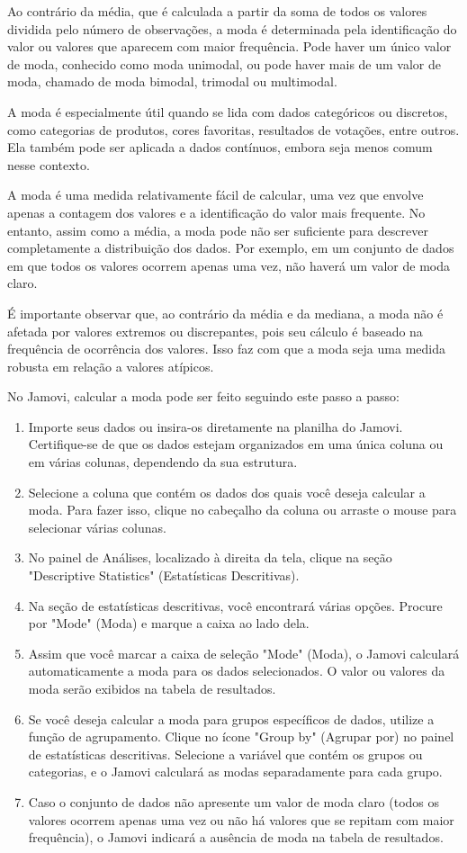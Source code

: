 Ao contrário da média, que é calculada a partir da soma de todos os valores dividida pelo número de observações, a moda é determinada pela identificação do valor ou valores que aparecem com maior frequência. Pode haver um único valor de moda, conhecido como moda unimodal, ou pode haver mais de um valor de moda, chamado de moda bimodal, trimodal ou multimodal.

A moda é especialmente útil quando se lida com dados categóricos ou discretos, como categorias de produtos, cores favoritas, resultados de votações, entre outros. Ela também pode ser aplicada a dados contínuos, embora seja menos comum nesse contexto.

A moda é uma medida relativamente fácil de calcular, uma vez que envolve apenas a contagem dos valores e a identificação do valor mais frequente. No entanto, assim como a média, a moda pode não ser suficiente para descrever completamente a distribuição dos dados. Por exemplo, em um conjunto de dados em que todos os valores ocorrem apenas uma vez, não haverá um valor de moda claro.

É importante observar que, ao contrário da média e da mediana, a moda não é afetada por valores extremos ou discrepantes, pois seu cálculo é baseado na frequência de ocorrência dos valores. Isso faz com que a moda seja uma medida robusta em relação a valores atípicos.

No Jamovi, calcular a moda pode ser feito seguindo este passo a passo:

\begin{enumerate}
    \item Importe seus dados ou insira-os diretamente na planilha do Jamovi. Certifique-se de que os dados estejam organizados em uma única coluna ou em várias colunas, dependendo da sua estrutura.
    \item Selecione a coluna que contém os dados dos quais você deseja calcular a moda. Para fazer isso, clique no cabeçalho da coluna ou arraste o mouse para selecionar várias colunas.
    \item No painel de Análises, localizado à direita da tela, clique na seção "Descriptive Statistics" (Estatísticas Descritivas).
    \item Na seção de estatísticas descritivas, você encontrará várias opções. Procure por "Mode" (Moda) e marque a caixa ao lado dela.
    \item Assim que você marcar a caixa de seleção "Mode" (Moda), o Jamovi calculará automaticamente a moda para os dados selecionados. O valor ou valores da moda serão exibidos na tabela de resultados.
    \item Se você deseja calcular a moda para grupos específicos de dados, utilize a função de agrupamento. Clique no ícone "Group by" (Agrupar por) no painel de estatísticas descritivas. Selecione a variável que contém os grupos ou categorias, e o Jamovi calculará as modas separadamente para cada grupo.
    \item Caso o conjunto de dados não apresente um valor de moda claro (todos os valores ocorrem apenas uma vez ou não há valores que se repitam com maior frequência), o Jamovi indicará a ausência de moda na tabela de resultados.
\end{enumerate}


